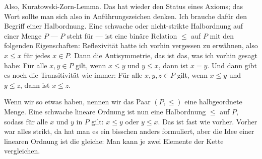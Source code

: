 \begin{spoken-clean}[00:56:40 - 00:58:40]
Also, Kuratowski-Zorn-Lemma. Das hat wieder den Status eines Axioms; das Wort  sollte man sich also in Anführungszeichen denken. Ich brauche dafür den Begriff einer Halbordnung. Eine schwache oder nicht-strikte Halbordnung auf einer Menge $P$ --- $P$ steht für  --- ist eine binäre Relation $\le$ auf $P$ mit den folgenden Eigenschaften: Reflexivität hatte ich vorhin vergessen zu erwähnen, also $x \le x$ für jedes $x \in P$. Dann die Antisymmetrie, das ist das, was ich vorhin gesagt habe: Für alle $x, y \in P$ gilt, wenn $x \le y$ und $y \le x$, dann ist $x = y$. Und dann gibt es noch die Transitivität wie immer: Für alle $x, y, z \in P$ gilt, wenn $x \le y$ und $y \le z$, dann ist $x \le z$.

Wenn wir so etwas haben, nennen wir das Paar $(P, \le)$ eine halbgeordnete Menge. Eine schwache lineare Ordnung ist nun eine Halbordnung $\le$ auf $P$, sodass für alle $x$ und $y$ in $P$ gilt: $x \le y$ oder $y \le x$. Das ist fast wie vorher. Vorher war alles strikt, da hat man es ein bisschen anders formuliert, aber die Idee einer linearen Ordnung ist die gleiche: Man kann je zwei Elemente der Kette vergleichen.
\end{spoken-clean}

\begin{math-stroke}


\end{math-stroke}

